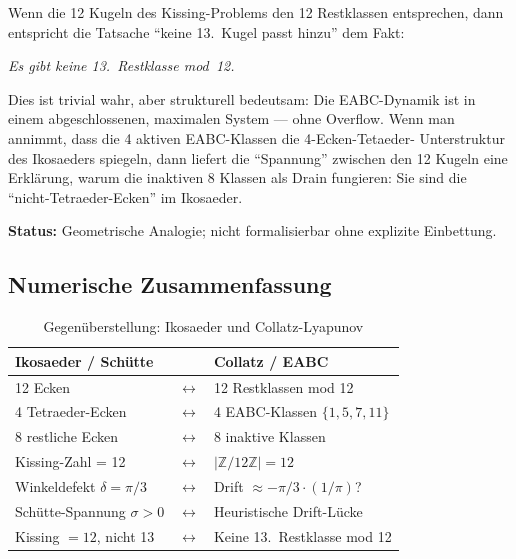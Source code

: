 \documentclass[12pt,a4paper]{article}
\newcommand{\Z}{\mathbb{Z}}
\newcommand{\ZmZ}{\Z/12\Z}
\begin{document}
\begin{tcolorbox}[ikosaeder, title={Beitrag 3: Kissing-Bound als Mischungsschranke (Analogie)}]
Wenn die 12 Kugeln des Kissing-Problems den 12 Restklassen entsprechen,
dann entspricht die Tatsache ``keine 13.\ Kugel passt hinzu'' dem Fakt:

\medskip\noindent
\emph{Es gibt keine 13.\ Restklasse mod~12.}

\medskip
Dies ist trivial wahr, aber strukturell bedeutsam: Die EABC-Dynamik ist
in einem abgeschlossenen, maximalen System --- ohne Overflow.
Wenn man annimmt, dass die 4 aktiven EABC-Klassen die 4-Ecken-Tetaeder-
Unterstruktur des Ikosaeders spiegeln, dann liefert die ``Spannung''
zwischen den 12 Kugeln eine Erklärung, warum die inaktiven 8 Klassen
als Drain fungieren: Sie sind die ``nicht-Tetraeder-Ecken'' im Ikosaeder.

\textbf{Status:} Geometrische Analogie; nicht formalisierbar ohne
explizite Einbettung.
\end{tcolorbox}

\subsection{Numerische Zusammenfassung}

\begin{table}[h!]
\centering
\caption{Gegenüberstellung: Ikosaeder und Collatz-Lyapunov}
\label{tab:vergleich}
\renewcommand{\arraystretch}{1.35}
\begin{tabular}{p{5.5cm} c p{6cm}}
\toprule
\textbf{Ikosaeder / Schütte} & & \textbf{Collatz / EABC} \\
\midrule
12 Ecken & $\longleftrightarrow$ & 12 Restklassen mod 12 \\
4 Tetraeder-Ecken & $\longleftrightarrow$ & 4 EABC-Klassen $\{1,5,7,11\}$ \\
8 restliche Ecken & $\longleftrightarrow$ & 8 inaktive Klassen \\
Kissing-Zahl = 12 & $\longleftrightarrow$ & $|\ZmZ| = 12$ \\
Winkeldefekt $\delta = \pi/3$ & $\longleftrightarrow$ & Drift $\approx -\pi/3 \cdot (1/\pi)$?\\
Schütte-Spannung $\sigma > 0$ & $\longleftrightarrow$ & Heuristische Drift-Lücke \\
Kissing $= 12$, nicht 13 & $\longleftrightarrow$ & Keine 13.\ Restklasse mod 12 \\
\bottomrule
\end{tabular}
\end{table}
\end{document}
